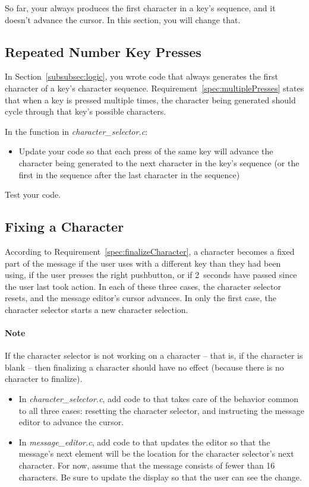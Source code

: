 So far, your always produces the first character in a key's sequence, and it doesn't advance the cursor.
In this section, you will change that.

\subsection{Repeated Number Key Presses} \label{subsec:characterSequencing}

In Section~\ref{subsubsec:logic}, you wrote code that always generates the first character of a key's character sequence.
Requirement~\ref{spec:multiplePresses} states that when a key is pressed multiple times, the character being generated should cycle through that key's possible characters.

In the  function in \textit{character\_selector.c}:
\begin{itemize}
    \item Update your code so that each press of the same key will advance the character being generated to the next character in the key's sequence (or the first in the sequence after the last character in the sequence)
\end{itemize}

Test your code.


\subsection{Fixing a Character} \label{subsec:finalizeCharacter}

According to Requirement~\ref{spec:finalizeCharacter}, a character becomes a fixed part of the message if the user uses with a different key than they had been using, if the user presses the right pushbutton, or if 2~seconds have passed since the user last took action.
In each of these three cases, the character selector resets, and the message editor's cursor advances.
In only the first case, the character selector starts a new character selection.

\paragraph{Note} If the character selector is not working on a character -- that is, if the character is blank -- then finalizing a character should have no effect (because there is no character to finalize). \\

\begin{itemize}
    \item In \textit{character\_selector.c}, add code to  that takes care of the behavior common to all three cases: resetting the character selector, and instructing the message editor to advance the cursor.
    \item In \textit{message\_editor.c}, add code to  that updates the editor so that the message's next element will be the location for the character selector's next character.
        For now, assume that the message consists of fewer than 16 characters.
        Be sure to update the display so that the user can see the change.
\end{itemize}

